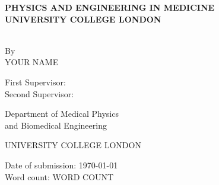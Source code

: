 \documentclass[12pt]{report}
\author{Your Name}
\numberwithin{figure}{chapter}
\begin{document}
\begin{titlepage}
\begin{center}
    \vspace*{-3cm}
    
    \vspace{2.3cm}
    
    {}

    \vspace{1cm}
    {\textbf{PHYSICS AND ENGINEERING IN MEDICINE\\}}
    \vspace{0.3cm}
    {\textbf{UNIVERSITY COLLEGE LONDON\\}}
    \vspace{2.4cm}
    
    {}\\
    By\\
    YOUR NAME\\
    \vspace{0.9cm}
    {\begin{singlespace}First Supervisor: \\
    Second Supervisor: \\\end{singlespace}}
\end{center}
{\raggedleft\vfill{\begin{singlespace}
     Department of Medical Physics\\
  and Biomedical Engineering\\
\end{singlespace}
 UNIVERSITY COLLEGE LONDON\\
 \begin{singlespace}
 Date of submission: \today\\
 Word count: WORD COUNT\\
 \end{singlespace}
}\par
}
\end{titlepage}
\end{document}
